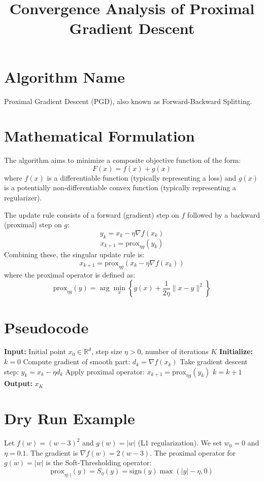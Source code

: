 \documentclass[11pt]{article}
\begin{document}
\title{Convergence Analysis of Proximal Gradient Descent}
\author{}
\date{}
\maketitle

\section*{Algorithm Name}
Proximal Gradient Descent (PGD), also known as Forward-Backward Splitting.

\section*{Mathematical Formulation}
The algorithm aims to minimize a composite objective function of the form:
$$F(x) = f(x) + g(x)$$
where $f(x)$ is a differentiable function (typically representing a loss) and $g(x)$ is a potentially non-differentiable convex function (typically representing a regularizer). 

The update rule consists of a forward (gradient) step on $f$ followed by a backward (proximal) step on $g$:
$$y_k = x_k - \eta \nabla f(x_k)$$
$$x_{k+1} = \text{prox}_{\eta g}(y_k)$$
Combining these, the singular update rule is:
$$x_{k+1} = \text{prox}_{\eta g}(x_k - \eta \nabla f(x_k))$$
where the proximal operator is defined as:
$$\text{prox}_{\eta g}(y) = \arg\min_{x} \left\{ g(x) + \frac{1}{2\eta} \|x - y\|^2 \right\}$$

\section*{Pseudocode}
\begin{algorithm}[H]
\caption{Proximal Gradient Descent (PGD)}
\begin{algorithmic}[1]
\State \textbf{Input:} Initial point $x_0 \in \mathbb{R}^d$, step size $\eta > 0$, number of iterations $K$
\State \textbf{Initialize:} $k = 0$
    \State Compute gradient of smooth part: $d_k = \nabla f(x_k)$
    \State Take gradient descent step: $y_k = x_k - \eta d_k$
    \State Apply proximal operator: $x_{k+1} = \text{prox}_{\eta g}(y_k)$
    \State $k = k + 1$
\EndWhile
\State \textbf{Output:} $x_K$
\end{algorithmic}
\end{algorithm}

\section*{Dry Run Example}
Let $f(w) = (w-3)^2$ and $g(w) = |w|$ (L1 regularization). We set $w_0 = 0$ and $\eta = 0.1$.
The gradient is $\nabla f(w) = 2(w-3)$.
The proximal operator for $g(w) = |w|$ is the Soft-Thresholding operator:
$$\text{prox}_{\eta |\cdot|}(y) = S_\eta(y) = \text{sign}(y)\max(|y|-\eta, 0)$$
\end{document}
